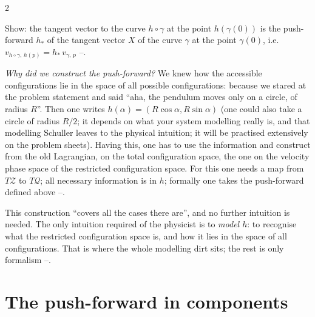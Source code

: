 \begin{paracol}{2}
\begin{exercise}\label{ex:zw-curve}
Show: the tangent vector to the curve $h\circ\gamma$ at the point $h(\gamma(0))$ is the push-forward $h_*$ of the tangent vector $X$ of the curve $\gamma$ at the point $\gamma(0)$, i.e.\ $v_{h\circ\gamma,\,h(p)}=h_*\,v_{\gamma,\,p}$ --.
\end{exercise}

\emph{Why did we construct the push-forward?} We knew how the accessible configurations lie in the space of all possible configurations: because we stared at the problem statement and said ``aha, the pendulum moves only on a circle, of radius $R$''. Then one writes $h(\alpha)=(R\cos\alpha,R\sin\alpha)$ (one could also take a circle of radius $R/2$; it depends on what your system modelling really is, and that modelling Schuller leaves to the physical intuition; it will be practised extensively on the problem sheets). Having this, one has to use the information and construct from the old Lagrangian, on the total configuration space, the one on the velocity phase space of the restricted configuration space. For this one needs a map from $T\mathcal Z$ to $T\mathcal Q$; all necessary information is in $h$; formally one takes the push-forward defined above --.

\begin{intuition}\label{int:zw-modelling}
This construction ``covers all the cases there are'', and no further intuition is needed. The only intuition required of the physicist is to \emph{model $h$}: to recognise what the restricted configuration space is, and how it lies in the space of all configurations. That is where the whole modelling dirt sits; the rest is only formalism --.
\end{intuition}

\section{The push-forward in components}\label{sec:zw-components}


\end{paracol}
